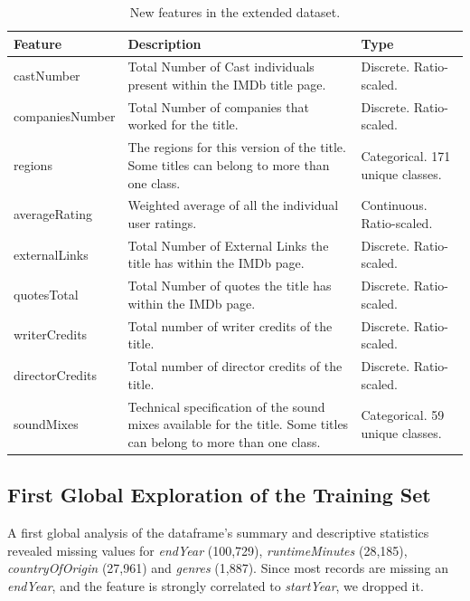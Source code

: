 \begin{table}
    \centering
    \renewcommand{\arraystretch}{1.2}
    \scriptsize
    \begin{tabular}{p{3cm}p{7.5cm}p{3cm}}
        \toprule
        \textbf{Feature} & \textbf{Description} & \textbf{Type} \\ \midrule
        castNumber & Total Number of Cast individuals present within the IMDb title page. & Discrete. Ratio-scaled. \\
        companiesNumber & Total Number of companies that worked for the title. & Discrete. Ratio-scaled. \\
        regions & The regions for this version of the title. Some titles can belong to more than one class. & Categorical. 171 unique classes. \\
        averageRating & Weighted average of all the individual user ratings. & Continuous. Ratio-scaled. \\
        externalLinks & Total Number of External Links the title has within the IMDb page. & Discrete. Ratio-scaled. \\
        quotesTotal & Total Number of quotes the title has within the IMDb page. & Discrete. Ratio-scaled. \\
        writerCredits & Total number of writer credits of the title. & Discrete. Ratio-scaled. \\
        directorCredits & Total number of director credits of the title. & Discrete. Ratio-scaled. \\
        soundMixes & Technical specification of the sound mixes available for the title. Some titles can belong to more than one class. & Categorical. 59 unique classes. \\
        \bottomrule
    \end{tabular}
    \caption{New features in the extended dataset.}
    \label{tab:original_feats}
\end{table}

\subsection{First Global Exploration of the Training Set}
A first global analysis of the dataframe's summary and descriptive statistics revealed missing values for \textit{endYear} (100,729), \textit{runtimeMinutes} (28,185), \textit{countryOfOrigin} (27,961) and \textit{genres} (1,887). Since most records are missing an \textit{endYear}, and the feature is strongly correlated to \textit{startYear}, we dropped it.

